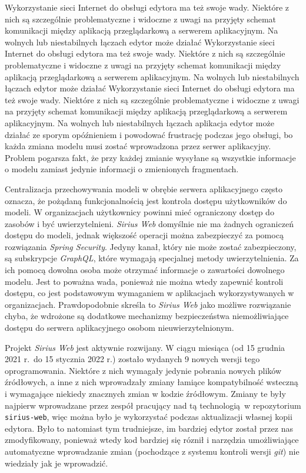 Wykorzystanie sieci Internet do obsługi edytora ma też swoje wady. Niektóre z
nich są szczególnie problematyczne i widoczne z uwagi na przyjęty schemat
komunikacji między aplikacją przeglądarkową a serwerem aplikacyjnym. Na wolnych
lub niestabilnych łączach edytor może działać Wykorzystanie sieci Internet do
obsługi edytora ma też swoje wady. Niektóre z nich są szczególnie
problematyczne i widoczne z uwagi na przyjęty schemat komunikacji między
aplikacją przeglądarkową a serwerem aplikacyjnym. Na wolnych lub niestabilnych
łączach edytor może działać Wykorzystanie sieci Internet do obsługi edytora ma
też swoje wady. Niektóre z nich są szczególnie problematyczne i widoczne z
uwagi na przyjęty schemat komunikacji między aplikacją przeglądarkową a
serwerem aplikacyjnym. Na wolnych lub niestabilnych łączach aplikacja edytor
może działać ze sporym opóźnieniem i powodować frustrację podczas jego obsługi,
bo każda zmiana modelu musi zostać wprowadzona przez serwer aplikacyjny.
Problem pogarsza fakt, że przy każdej zmianie wysyłane są wszystkie informacje
o modelu zamiast jedynie informacji o zmienionych fragmentach.

Centralizacja przechowywania modeli w obrębie serwera aplikacyjnego często
oznacza, że pożądaną funkcjonalnością jest kontrola dostępu użytkowników do
modeli. W organizacjach użytkownicy powinni mieć ograniczony dostęp do zasobów
i być uwierzytelnieni. \emph{Sirius Web} domyślnie nie ma żadnych ograniczeń
dostępu do modeli, jednak większość operacji można zabezpieczyć za pomocą
rozwiązania \emph{Spring Security}. Jedyny kanał, który nie może zostać
zabezpieczony, są subskrypcje \emph{GraphQL}, które wymagają specjalnej metody
uwierzytelnienia. Za ich pomocą dowolna osoba może otrzymać informacje o
zawartości dowolnego modelu. Jest to poważna wada, ponieważ nie można wtedy
zapewnić kontroli dostępu, co jest podstawowym wymaganiem w aplikacjach
wykorzystywanych w organizacjach. Prawdopodobnie skreśla to \emph{Sirius Web}
jako możliwe rozwiązanie chyba, że wdrożone są dodatkowe mechanizmy
bezpieczeństwa niemożliwiające dostępu do serwera aplikacyjnego osobom
nieuwierzytelnionym.

Projekt \emph{Sirius Web} jest aktywnie rozwijany. W ciągu miesiąca (od 15
grudnia 2021 r.\ do 15 stycznia 2022 r.) zostało wydanych 9 nowych wersji tego
oprogramowania. Niektóre z nich wymagały jedynie pobrania nowych plików
źródłowych, a inne z nich wprowadzały zmiany łamiące kompatybilność wsteczną i
wymagające niekiedy znacznych zmian w kodzie źródłowym. Zmiany te były najpierw
wprowadzane przez zespół pracujący nad tą technologią w repozytorium
\texttt{sirius-web}, więc można było je wykorzystać podczas aktualizacji
własnej kopii edytora. Było to natomiast tym trudniejsze, im bardziej edytor
został przez nas zmodyfikowany, ponieważ wtedy kod bardziej się róznił i
narzędzia umożliwiające automatyczne wprowadzanie zmian (pochodzące z systemu
kontroli wersji \emph{git}) nie wiedziały jak je wprowadzić.


